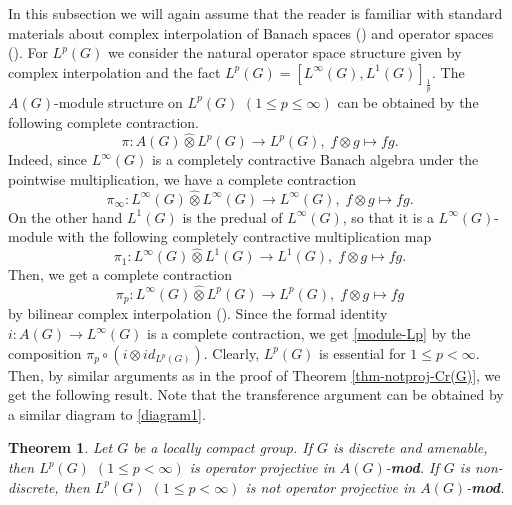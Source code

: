 \documentclass[10pt]{amsart}
\newtheorem{thm}{Theorem}
\numberwithin{thm}{section}
\numberwithin{equation}{section}
\begin{document}
In this subsection we will again assume that the reader is familiar with standard materials about
complex interpolation of Banach spaces (\cite{BL76}) and operator spaces (\cite{P96}).
For $L^p(G)$ we consider the natural operator space structure given by complex interpolation
and the fact $L^p(G) = [L^\infty(G), L^1(G)]_{\frac{1}{p}}$.
The $A(G)$-module structure on $L^p(G)$ $(1\le p \le \infty)$ can be obtained by the following complete contraction.
	\begin{equation}\label{module-Lp}
	\pi : A(G) {\widehat{\otimes}} L^p(G) \rightarrow L^p(G),\; f\otimes g \mapsto f g.
	\end{equation}
Indeed, since $L^\infty(G)$ is a completely contractive Banach algebra under the pointwise multiplication, we have a complete contraction
	$$\pi_\infty : L^\infty(G) {\widehat{\otimes}} L^\infty(G) \rightarrow L^\infty(G),\; f\otimes g \mapsto f g.$$
On the other hand $L^1(G)$ is the predual of $L^\infty(G)$,
so that it is a $L^\infty(G)$-module with the following completely contractive multiplication map
	$$\pi_1 : L^\infty(G) {\widehat{\otimes}} L^1(G) \rightarrow L^1(G),\; f\otimes g \mapsto f g.$$
Then, we get a complete contraction
	$$\pi_p : L^\infty(G) {\widehat{\otimes}} L^p(G) \rightarrow L^p(G),\; f\otimes g \mapsto f g$$
by bilinear complex interpolation (\cite[section 2.7]{P03}).
Since the formal identity $i : A(G) \rightarrow L^\infty(G)$ is a complete contraction,
we get \eqref{module-Lp} by the composition $\pi_p \circ (i \otimes id_{L^p(G)})$.
Clearly, $L^p(G)$ is essential for $1\le p<\infty$.
Then, by similar arguments as in the proof of Theorem \ref{thm-notproj-Cr(G)}, we get the following result.
Note that the transference argument can be obtained by a similar diagram to \eqref{diagram1}.

	\begin{thm}\label{thm-comLp}
	Let $G$ be a locally compact group. If $G$ is discrete and amenable,
	then $L^p(G)$ $(1\le p<\infty)$ is operator projective in $A(G)$-{\bf mod}.
	If $G$ is non-discrete, then $L^p(G)$ $(1\le p < \infty)$ is not operator projective in $A(G)$-{\bf mod}.
	\end{thm}
\end{document}
